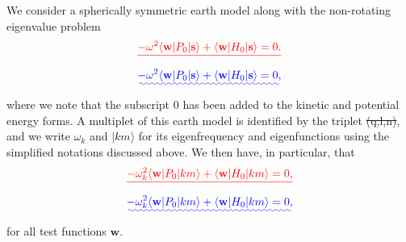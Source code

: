 \documentclass[a4paper,12pt]{paper}
\providecommand{\DIFadd}[1]{{\protect\color{blue}\uwave{#1}}} %
\providecommand{\DIFdel}[1]{{\protect\color{red}\sout{#1}}}                      %
\providecommand{\DIFaddbegin}{} %
\providecommand{\DIFaddend}{} %
\providecommand{\DIFdelbegin}{} %
\providecommand{\DIFdelend}{} %
\begin{document}
We consider a spherically symmetric earth model along with the non-rotating eigenvalue problem
\DIFdelbegin \begin{displaymath}
\DIFdel{-\omega^{2}\langle \mathbf{w}|P_{0}|\mathbf{s}\rangle+\langle \mathbf{w}|H_{0}|\mathbf{s}\rangle=0.
}\end{displaymath}%
\DIFdelend \DIFaddbegin \begin{equation}\DIFadd{\label{eq:19}
-\omega^{2}\langle \mathbf{w}|P_{0}|\mathbf{s}\rangle+\langle \mathbf{w}|H_{0}|\mathbf{s}\rangle=0,
}\end{equation}\DIFaddend 
where we note that the subscript $0$ has been added to the kinetic and potential energy forms. A multiplet of 
this earth model is identified by the triplet \DIFdelbegin \DIFdel{(q,l,n)}\DIFdelend \DIFaddbegin \DIFadd{$(q,l,n)$}\DIFaddend , and we write $\omega_{k}$ and $|km\rangle$ for its 
eigenfrequency and eigenfunctions using the simplified notations discussed above. We then have, in particular, that
\DIFdelbegin \begin{displaymath}
\DIFdel{-\omega_{k}^{2}\langle \mathbf{w}|P_{0}|km\rangle+\langle \mathbf{w}|H_{0}|km\rangle=0,
}\end{displaymath}%
\DIFdelend \DIFaddbegin \begin{equation}\DIFadd{\label{eq:20}
-\omega_{k}^{2}\langle \mathbf{w}|P_{0}|km\rangle+\langle \mathbf{w}|H_{0}|km\rangle=0,
}\end{equation}\DIFaddend 
for all test functions $\mathbf{w}$. 
\end{document}
